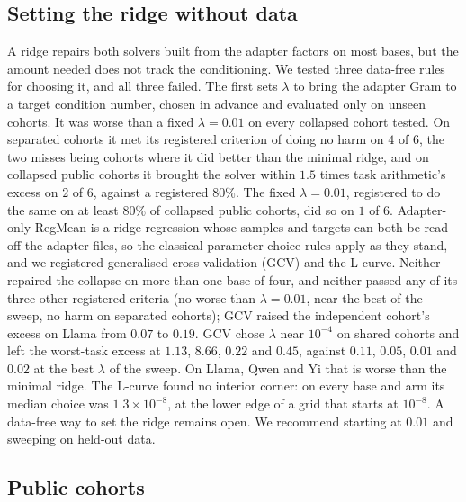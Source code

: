 \subsection{Setting the ridge without data}\label{subsec:lambda}

A ridge repairs both solvers built from the adapter factors on most bases,
but the amount needed does not track the conditioning. We tested three data-free rules for choosing it, and all three
failed. The first sets $\lambda$ to bring the adapter Gram to a target
condition number, chosen in advance and evaluated only on unseen cohorts. It
was worse than a fixed $\lambda = 0.01$ on every collapsed cohort tested. On
separated cohorts it met its registered criterion of doing no harm on $4$ of
$6$, the two misses being cohorts where it did better than the minimal ridge,
and on collapsed public cohorts it brought the solver within $1.5$ times task
arithmetic's excess on $2$ of $6$, against a registered $80\%$. The fixed
$\lambda = 0.01$, registered to do the same on at least $80\%$ of collapsed
public cohorts, did so on $1$ of $6$.
Adapter-only RegMean is a ridge regression whose samples and targets can both
be read off the adapter files, so the classical parameter-choice rules apply as
they stand, and we registered generalised cross-validation (GCV) and the
L-curve. Neither repaired the collapse on more than one base of four, and
neither passed any of its three other registered criteria (no worse than
$\lambda = 0.01$, near the best of the sweep, no harm on separated cohorts);
GCV raised the independent cohort's excess on Llama from $0.07$ to $0.19$. GCV
chose $\lambda$ near $10^{-4}$ on shared cohorts and left the worst-task
excess at $1.13$, $8.66$, $0.22$ and $0.45$, against $0.11$, $0.05$, $0.01$
and $0.02$ at the best $\lambda$ of the sweep. On Llama, Qwen and Yi that is
worse than the minimal ridge. The L-curve found no interior corner: on every
base and arm its median choice was $1.3\times10^{-8}$, at the lower edge of a
grid that starts at $10^{-8}$. A data-free way to set the ridge
remains open. We recommend starting at $0.01$ and sweeping on held-out data.

\subsection{Public cohorts}\label{subsec:against}

